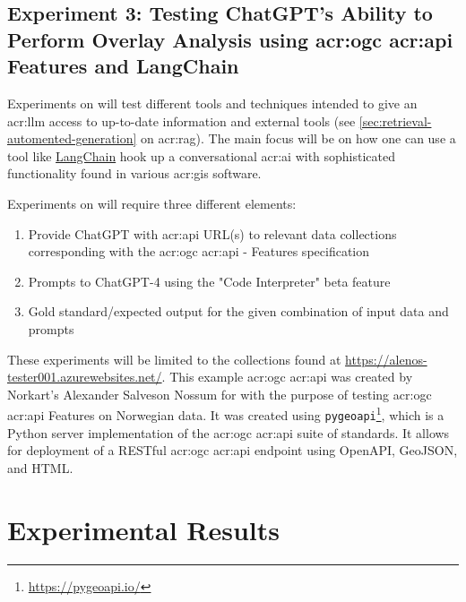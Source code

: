 \subsection[Experiment 3: Testing ChatGPT's Ability to Perform Overlay Analysis using OGC API Features]{Experiment 3: Testing ChatGPT's Ability to Perform Overlay Analysis using \acrshort{acr:ogc} \acrshort{acr:api} Features and LangChain}


Experiments on  will test different tools and techniques intended to give an \acrshort{acr:llm} access to up-to-date information and external tools (see \autoref{sec:retrieval-automented-generation} on \acrlong{acr:rag}). The main focus will be on how one can use a tool like \hyperref[subsubsec:langchain]{LangChain} hook up a conversational \acrshort{acr:ai} with sophisticated functionality found in various \acrshort{acr:gis} software.

Experiments on  will require three different elements:

\begin{enumerate}
    \item Provide ChatGPT with \acrshort{acr:api} URL(s) to relevant data collections corresponding with the \acrshort{acr:ogc} \acrshort{acr:api} - Features specification
    \item Prompts to ChatGPT-4 using the "Code Interpreter" beta feature
    \item Gold standard/expected output for the given combination of input data and prompts
\end{enumerate}

These experiments will be limited to the collections found at \url{https://alenos-tester001.azurewebsites.net/}. This example \acrshort{acr:ogc} \acrshort{acr:api} was created by Norkart's Alexander Salveson Nossum for with the purpose of testing \acrshort{acr:ogc} \acrshort{acr:api} Features on Norwegian data. It was created using \texttt{pygeoapi}\footnote{\url{https://pygeoapi.io/}}, which is a Python server implementation of the \acrshort{acr:ogc} \acrshort{acr:api} suite of standards. It allows for deployment of a RESTful \acrshort{acr:ogc} \acrshort{acr:api} endpoint using OpenAPI, GeoJSON, and HTML.

\section{Experimental Results}\label{sec:experimental-results}

